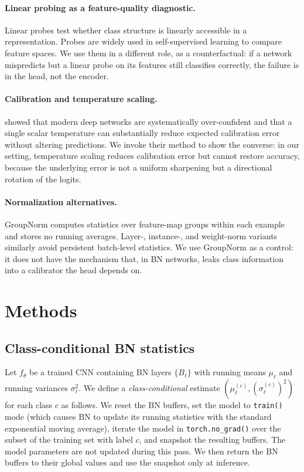 \documentclass[11pt]{article}
\begin{document}
\paragraph{Linear probing as a feature-quality diagnostic.}
Linear probes \cite{alain2016, kornblith2019} test whether class structure is linearly accessible in a representation. Probes are widely used in self-supervised learning to compare feature spaces. We use them in a different role, as a counterfactual: if a network mispredicts but a linear probe on its features still classifies correctly, the failure is in the head, not the encoder.

\paragraph{Calibration and temperature scaling.}
\citet{guo2017} showed that modern deep networks are systematically over-confident and that a single scalar temperature can substantially reduce expected calibration error without altering predictions. We invoke their method to show the converse: in our setting, temperature scaling reduces calibration error but cannot restore accuracy, because the underlying error is not a uniform sharpening but a directional rotation of the logits.

\paragraph{Normalization alternatives.}
GroupNorm \cite{wu2018} computes statistics over feature-map groups within each example and stores no running averages. Layer-, instance-, and weight-norm variants similarly avoid persistent batch-level statistics. We use GroupNorm as a control: it does not have the mechanism that, in BN networks, leaks class information into a calibrator the head depends on.

\section{Methods}

\subsection{Class-conditional BN statistics}
Let $f_\theta$ be a trained CNN containing BN layers $\{B_\ell\}$ with running means $\mu_\ell$ and running variances $\sigma_\ell^2$. We define a \emph{class-conditional} estimate $(\mu_\ell^{(c)}, (\sigma_\ell^{(c)})^2)$ for each class $c$ as follows. We reset the BN buffers, set the model to \texttt{train()} mode (which causes BN to update its running statistics with the standard exponential moving average), iterate the model in \texttt{torch.no\_grad()} over the subset of the training set with label $c$, and snapshot the resulting buffers. The model parameters are not updated during this pass. We then return the BN buffers to their global values and use the snapshot only at inference.
\end{document}
